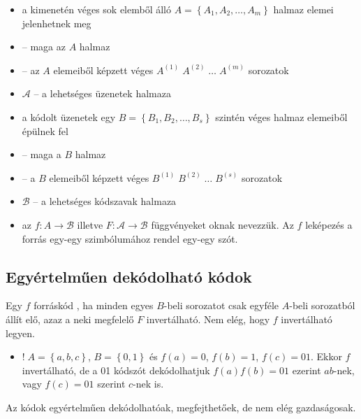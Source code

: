 \documentclass[../main.tex]{subfiles}
\begin{document}
\begin{itemize}
	\item a  kimenetén véges sok
	      elemből álló $A = \left\{ A_1, A_2, \dots, A_m \right\}$ halmaz
	      elemei jelenhetnek meg

	\item {} – maga az $A$ halmaz

	\item {} – az $A$ elemeiből képzett véges
	      $A^{(1)} \; A^{(2)} \; \dots \; A^{(m)}$ sorozatok

	\item $\mathcal{A}$ – a lehetséges üzenetek halmaza

	\item a kódolt üzenetek egy
	      $B = \left\{ B_1, B_2, \dots, B_s \right\}$
	      szintén véges halmaz elemeiből épülnek fel

	\item {} – maga a $B$ halmaz

	\item {} – a $B$ elemeiből képzett véges
	      $B^{(1)} \; B^{(2)} \; \dots \; B^{(s)}$ sorozatok

	\item $\mathcal{B}$ – a lehetséges kódszavak halmaza

	\item az $f: A \rightarrow \mathcal{B}$ illetve
	      $F: \mathcal{A} \rightarrow \mathcal{B}$ függvényeket
	      oknak nevezzük. Az $f$ leképezés
	      a forrás egy-egy szimbólumához rendel egy-egy szót.
\end{itemize}

\subsection{Egyértelműen dekódolható kódok}

Egy $f$ forráskód ,
ha minden egyes $B$-beli sorozatot csak egyféle
$A$-beli sorozatból állít elő, azaz a neki
megfelelő $F$ invertálható. Nem elég, hogy $f$
invertálható legyen.
\begin{itemize}
	\item $! \; A = \left\{a, b, c\right\}$, $B = \left\{ 0, 1\right\}$
	      és $f(a) = 0$, $f(b) = 1$, $f(c) = 01$. Ekkor $f$ invertálható,
	      de a 01 kódszót dekódolhatjuk $f(a) f(b) = 01$ ezerint $ab$-nek,
	      vagy $f(c)=01$ szerint $c$-nek is.
\end{itemize}
Az 
kódok egyértelműen dekódolhatóak, megfejthetőek,
de nem elég gazdaságosak.
\end{document}
